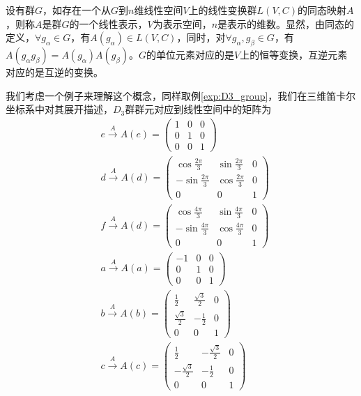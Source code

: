 \begin{definition}
	设有群$G$，如存在一个从$G$到$n$维线性空间$V$上的线性变换群$L(V,C)$的同态映射$A$，则称$A$是群$G$的一个线性表示，$V$为表示空间，$n$是表示的维数。显然，由同态的定义，$\forall g_\alpha \in G$，有$A(g_\alpha) \in L(V, C)$，同时，对$\forall g_\alpha, g_\beta \in G$，有$A(g_\alpha g_\beta) = A(g_\alpha)A(g_\beta)$。$G$的单位元素对应的是$V$上的恒等变换，互逆元素对应的是互逆的变换。
\end{definition}
我们考虑一个例子来理解这个概念，同样取例\ref{exp:D3_group}，我们在三维笛卡尔坐标系中对其展开描述，$D_3$群群元对应到线性空间中的矩阵为
\begin{equation*}
	\begin{aligned}
		&e \xrightarrow[]{A}
		A(e) = 
		\begin{pmatrix}
			1	&	0	&	0	\\
			0	&	1	&	0	\\
			0	&	0	&	1
		\end{pmatrix}
		\\
		&d \xrightarrow[]{A}
		A(d) =
		\begin{pmatrix}
			\cos \frac{2\pi}{3}	&	\sin \frac{2\pi}{3}	&	0	\\
			-\sin	\frac{2\pi}{3}	&	\cos \frac{2\pi}{3}	&	0	\\
			0	&	0	&	1
		\end{pmatrix}
		\\
		&f \xrightarrow[]{A}
		A(d) =
		\begin{pmatrix}
			\cos  \frac{4\pi}{3}	&	\sin \frac{4\pi}{3}	&	0	\\
			-\sin \frac{4\pi}{3}	&	\cos \frac{4\pi}{3}	&	0	\\
			0						&	0					&	1
		\end{pmatrix}
		\\
		&a \xrightarrow[]{A}
		A(a) =
		\begin{pmatrix}
			-1	&	0	&	0	\\
			0	&	1	&	0	\\
			0	&	0	&	1
		\end{pmatrix}
		\\
		&b \xrightarrow[]{A}
		A(b) =
		\begin{pmatrix}
			\frac{1}{2}			&	\frac{\sqrt{3}}{2}	&	0	\\
			\frac{\sqrt{3}}{2}	&	-\frac{1}{2}		&	0	\\
			0					&	0					&	1
		\end{pmatrix}
		\\
		&c \xrightarrow[]{A}
		A(c) =
		\begin{pmatrix}
			\frac{1}{2}			&	-\frac{\sqrt{3}}{2}	&	0	\\
			-\frac{\sqrt{3}}{2}	&	-\frac{1}{2}		&	0	\\
			0					&	0					&	1
		\end{pmatrix}
	\end{aligned}
\end{equation*} 
